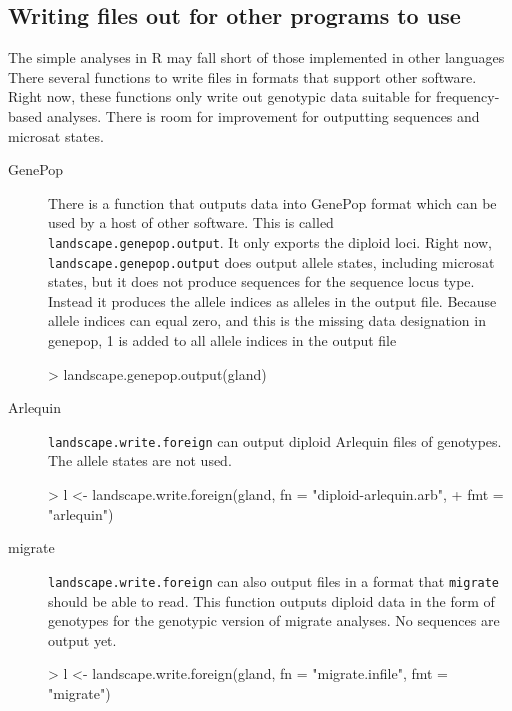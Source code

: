 \documentclass[10pt]{article}
\newcommand{\code}[1]{\texttt{#1}}
\begin{document}
\subsection{Writing files out for other programs to use}
\label{sec:writing-files-out}

The simple analyses in R may fall short of those implemented in other
languages There several functions to write files in formats that
support other software.  Right now, these functions only write out
genotypic data suitable for frequency-based analyses.  There is room
for improvement for outputting sequences and microsat states.  

\begin{description}
\item[GenePop] There is a function that outputs data into GenePop
  format which can be used by a host of other software.  This is
  called \code{landscape.genepop.output}.  It only exports the diploid
  loci. Right now, \code{landscape.genepop.output} does output allele
  states, including microsat states, but it does not produce sequences
  for the sequence locus type.  Instead it produces the allele indices
  as alleles in the output file.  Because allele indices can equal
  zero, and this is the missing data designation in genepop, 1 is
  added to all allele indices in the output file
\begin{Schunk}
\begin{Sinput}
> landscape.genepop.output(gland)
\end{Sinput}
\end{Schunk}
\item[Arlequin] \code{landscape.write.foreign} can output diploid
  Arlequin files of genotypes.  The allele states are not used.
\begin{Schunk}
\begin{Sinput}
> l <- landscape.write.foreign(gland, fn = "diploid-arlequin.arb", 
+     fmt = "arlequin")
\end{Sinput}
\end{Schunk}
\item[migrate] \code{landscape.write.foreign} can also output files in
  a format that \code{migrate} should be able to read.  This function
  outputs diploid data in the form of genotypes for the genotypic
  version of migrate analyses.  No sequences are output yet.
\begin{Schunk}
\begin{Sinput}
> l <- landscape.write.foreign(gland, fn = "migrate.infile", fmt = "migrate")
\end{Sinput}

\end{Schunk}
\end{description}
\end{document}
